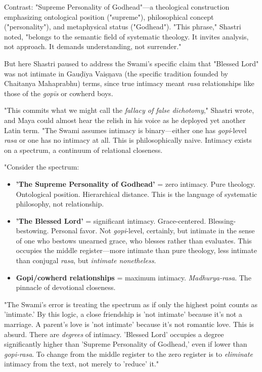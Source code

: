 \documentclass[12pt,twoside]{book}
\begin{document}
Contrast: "Supreme Personality of Godhead"—a theological construction emphasizing ontological position ("supreme"), philosophical concept ("personality"), and metaphysical status ("Godhead"). "This phrase," Shastri noted, "belongs to the semantic field of systematic theology. It invites analysis, not approach. It demands understanding, not surrender."

But here Shastri paused to address the Swami's specific claim that "Blessed Lord" was not intimate in Gauḍīya Vaiṣṇava (the specific tradition founded by Chaitanya Mahaprabhu) terms, since true intimacy meant \emph{rasa} relationships like those of the \emph{gopīs} or cowherd boys.

"This commits what we might call the \emph{fallacy of false dichotomy}," Shastri wrote, and Maya could almost hear the relish in his voice as he deployed yet another Latin term. "The Swami assumes intimacy is binary—either one has \emph{gopi}-level \emph{rasa} or one has no intimacy at all. This is philosophically naive. Intimacy exists on a spectrum, a continuum of relational closeness.

"Consider the spectrum:

\begin{itemize}
\item \textbf{\textbf{'The Supreme Personality of Godhead'}} = zero intimacy. Pure theology. Ontological position. Hierarchical distance. This is the language of systematic philosophy, not relationship.

\item \textbf{\textbf{'The Blessed Lord'}} = significant intimacy. Grace-centered. Blessing-bestowing. Personal favor. Not \emph{gopi}-level, certainly, but intimate in the sense of one who bestows unearned grace, who blesses rather than evaluates. This occupies the middle register—more intimate than pure theology, less intimate than conjugal \emph{rasa}, but \emph{intimate nonetheless}.

\item \textbf{\textbf{Gopi/cowherd relationships}} = maximum intimacy. \emph{Madhurya-rasa}. The pinnacle of devotional closeness.
\end{itemize}

"The Swami's error is treating the spectrum as if only the highest point counts as 'intimate.' By this logic, a close friendship is 'not intimate' because it's not a marriage. A parent's love is 'not intimate' because it's not romantic love. This is absurd. There are \emph{degrees} of intimacy. 'Blessed Lord' occupies a degree significantly higher than 'Supreme Personality of Godhead,' even if lower than \emph{gopi-rasa}. To change from the middle register to the zero register is to \emph{eliminate} intimacy from the text, not merely to 'reduce' it."
\end{document}
